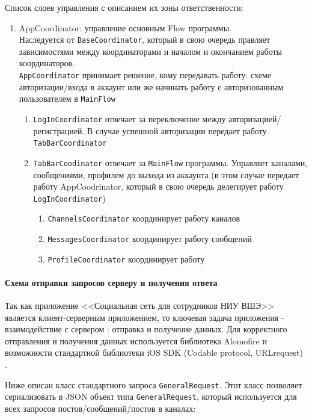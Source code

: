 \documentclass[a4paper,12pt]{article}
\begin{document}
	Список слоев управления с описанием их зоны ответственности:
	\begin{enumerate}
		\item AppCoordinator: управление основным Flow программы.\\ Наследуется от \verb|BaseCoordinator|, который в свою очередь правляет зависимостями между координаторами и началом и окончанием работы координаторов.\\ \verb|AppCoordinator| принимает решение, кому передавать работу: схеме авторизации/входа в аккаунт или же начинать работу с авторизованным пользователем в \verb|MainFlow|
		\begin{enumerate}
			\item \verb|LogInCoordinator| отвечает за переключение между авторизацией/регистрацией. В случае успешной авторизации передает работу \verb|TabBarCoordinator|
			\item \verb|TabBarCoodinator| отвечает за \verb|MainFlow| программы. Управляет каналами, сообщениями, профилем до выхода из аккаунта (в этом случае передает работу AppCoodrinator, который в свою очередь делегирует работу \verb|LogInCoordinator|)		
			\begin{enumerate}
				\item \verb|ChannelsCoordinator| координирует работу каналов
				\item \verb|MessagesCoordinator| координирует работу сообщений
				\item \verb|ProfileCoordinator| координирует работу 
			\end{enumerate}
		\end{enumerate}
	\end{enumerate}

	\paragraph{Схема отправки запросов серверу и получения ответа\\}
	Так как приложение <<Социальная сеть для сотрудников НИУ ВШЭ>> является клиент-серверным приложением, то ключевая задача приложения - взаимодействие с сервером \cite{server}: отправка и получение данных. Для корректного отправления и получения данных используется библиотека Alomofire \cite{Alomofire} и возможности стандартной библиотеки iOS SDK (Codable protocol, URLrequest) \cite{SDK}.
	
	Ниже описан класс стандартного запроса \verb|GeneralRequest|. Этот класс позволяет сериализовать в JSON объект типа \verb|GeneralRequest|, который используется для всех запросов постов/сообщений/постов в каналах:
	
\end{document}
